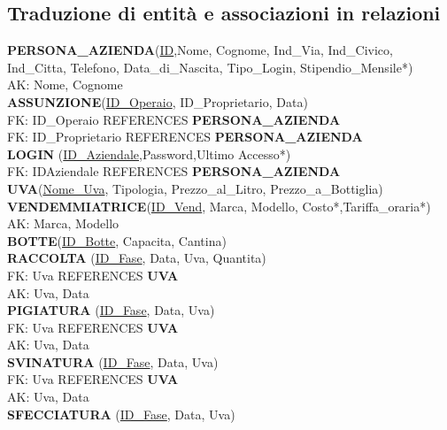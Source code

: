 \documentclass{article}
\begin{document}
\subsection{Traduzione di entità e associazioni in relazioni}
\textbf{PERSONA\_AZIENDA}(\underline{ID},Nome, Cognome, Ind\_Via, Ind\_Civico, Ind\_Citta, Telefono, Data\_di\_Nascita, Tipo\_Login, Stipendio\_Mensile*)\\
AK: Nome, Cognome\\\newline
\textbf{ASSUNZIONE}(\underline{ID\_Operaio}, ID\_Proprietario, Data)\\
FK: ID\_Operaio REFERENCES \textbf{PERSONA\_AZIENDA}\\
FK: ID\_Proprietario REFERENCES \textbf{PERSONA\_AZIENDA}\\\newline
\textbf{LOGIN }(\underline{ID\_Aziendale},Password,Ultimo Accesso*)\\
FK: IDAziendale REFERENCES \textbf{PERSONA\_AZIENDA}\\\newline
\textbf{UVA}(\underline{Nome\_Uva}, Tipologia, Prezzo\_al\_Litro, Prezzo\_a\_Bottiglia)\\\newline
\textbf{VENDEMMIATRICE}(\underline{ID\_Vend}, Marca, Modello, Costo*,Tariffa\_oraria*)\\
AK: Marca, Modello\\\newline
\textbf{BOTTE}(\underline{ID\_Botte}, Capacita, Cantina)\\\newline
\textbf{RACCOLTA }(\underline{ID\_Fase}, Data, Uva, Quantita)\\
FK: Uva REFERENCES \textbf{UVA}\\
AK: Uva, Data \\\newline
\textbf{PIGIATURA }(\underline{ID\_Fase}, Data, Uva)\\
FK: Uva REFERENCES \textbf{UVA}\\
AK: Uva, Data \\\newline
\textbf{SVINATURA }(\underline{ID\_Fase}, Data, Uva)\\
FK: Uva REFERENCES \textbf{UVA}\\
AK: Uva, Data \\\newline
\textbf{SFECCIATURA }(\underline{ID\_Fase}, Data, Uva)\\
\end{document}
